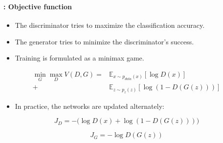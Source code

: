\documentclass[xcolor=table]{beamer}
\begin{document}
	\begin{frame}
		\frametitle{\insertshortsubtitle}
		\framesubtitle{\insertsection: Objective function}
		
		\begin{itemize}
			\item The discriminator tries to maximize the classification accuracy.
			\item The generator tries to minimize the discriminator's success.
			\item Training is formulated as a minimax game.
		\end{itemize}
		
		\begin{align*}
			\min_G \max_D V(D,G) = & \mathbb{E}_{x \sim p_{data}(x)}[\log D(x)] \\
			                     + & \mathbb{E}_{z \sim p_z(z)}[\log(1 - D(G(z)))]
		\end{align*}
		
		\vspace{0.2cm}
		
		\begin{itemize}
			\item In practice, the networks are updated alternately:
		\end{itemize}
		
		\[
		J_D = -\Big(\log D(x) + \log(1-D(G(z))) \Big)
		\]
		
		\[
		J_G = -\log D(G(z))
		\]
		
	\end{frame}
	
\end{document}
